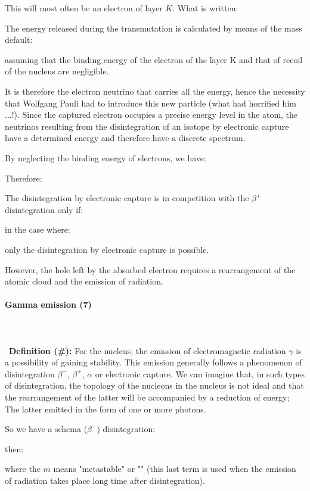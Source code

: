 	This will most often be an electron of layer $K$. What is written:
	
	The energy released during the transmutation is calculated by means of the mass default:
	
	assuming that the binding energy of the electron of the layer K and that of recoil of the nucleus are negligible.
	
	It is therefore the electron neutrino that carries all the energy, hence the necessity that Wolfgang Pauli had to introduce this new particle (what had horrified him ...!). Since the captured electron occupies a precise energy level in the atom, the neutrinos resulting from the disintegration of an isotope by electronic capture have a determined energy and therefore have a discrete spectrum.
	
	By neglecting the binding energy of electrons, we have:
	
	Therefore:
	
	The disintegration by electronic capture is in competition with the $\beta^{+}$ disintegration only if:
	
	in the case where:
	
	only the disintegration by electronic capture is possible.

	However, the hole left by the absorbed electron requires a rearrangement of the atomic cloud and the emission of radiation.
	
	
	\paragraph{Gamma emission (7)}\mbox{}\\\\\
	\textbf{Definition (\#\mydef):} For the nucleus, the emission of electromagnetic radiation $\gamma$ is a possibility of gaining stability. This emission generally follows a phenomenon of disintegration $\beta^{-}$, $\beta^{+}$, $\alpha$ or electronic capture. We can imagine that, in such types of disintegration, the topology of the nucleons in the nucleus is not ideal and that the rearrangement of the latter will be accompanied by a reduction of energy; The latter emitted in the form of one or more photons.

	So we have a schema ($\beta^{-}$) disintegration:
	
	then:
	
	where the $m$ means "metastable" or "" (this last term is used when the emission of radiation takes place long time after disintegration).
	
